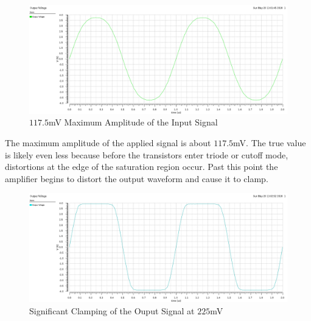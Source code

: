 \FloatBarrier

\begin{figure}[h!]
	\centering
	\includegraphics[scale=0.75]{../images/sim4_max_sin.PNG}
	\caption{$117.5$\si{\milli\volt} Maximum Amplitude of the Input Signal}
	\label{fig:sim4_max_sin}
\end{figure}

\FloatBarrier

The maximum amplitude of the applied signal is about $117.5$\si{\milli\volt}.
The true value is likely even less because before the transistors enter triode or cutoff mode, distortions at the edge of the saturation region occur.
Past this point the amplifier begins to distort the output waveform and cause it to clamp.

\FloatBarrier

\begin{figure}[h!]
	\centering
	\includegraphics[scale=0.75]{../images/sim4_past_max.PNG}
	\caption{Significant Clamping of the Ouput Signal at $225$\si{\milli\volt}}
	\label{fig:sim4_past_max}
\end{figure}

\FloatBarrier
